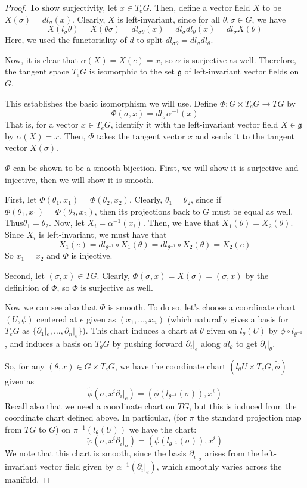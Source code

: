 \documentclass[fontsize=11pt]{scrartcl} %
\numberwithin{equation}{section} %
\numberwithin{figure}{section} %
\numberwithin{table}{section} %
\begin{document}
\begin{proof}
To show surjectivity, let $x\in T_eG$. Then, define a vector field $X$ to be $X(\sigma) = dl_{\sigma}(x)$.
Clearly, $X$ is left-invariant, since for all $\theta,\sigma \in G$, we have
\[
X(l_{\sigma}\theta) = X(\theta\sigma) = dl_{\sigma\theta}(x) = dl_{\sigma}dl_{\theta}(x) = dl_{\sigma}X(\theta)
\]
Here, we used the functoriality of $d$ to split $dl_{\sigma\theta} = dl_{\sigma}dl_{\theta}$.

Now, it is clear that $\alpha(X) = X(e) = x$, so $\alpha$ is surjective as well.
Therefore, the tangent space $T_eG$ is isomorphic to the set $\mathfrak{g}$ of left-invariant
vector fields on $G$. 

This establishes the basic isomorphism we will use. Define $\Phi:G\times T_eG\to TG$
by 
\[
\Phi(\sigma,x) = dl_{\sigma}\alpha^{-1}(x)
\] 
That is, for a vector $x\in T_eG$, identify
it with the left-invariant vector field $X\in\mathfrak{g}$ by $\alpha(X) = x$. Then,
$\Phi$ takes the tangent vector $x$ and sends it to the tangent vector $X(\sigma)$.

$\Phi$ can be shown to be a smooth bijection. First, we will show it is surjective and
injective, then we will show it is smooth.

First, let $\Phi(\theta_1,x_1) = \Phi(\theta_2,x_2)$. Clearly, $\theta_1 = \theta_2$, since
if $\Phi(\theta_1,x_1) = \Phi(\theta_2,x_2)$, then its projections back to $G$ must
be equal as well. Thus$\theta_1 =\theta_2$.
Now, let $X_i = \alpha^{-1}(x_i)$. Then, we have that $X_1(\theta)=X_2(\theta)$.
Since $X_i$ is left-invariant, we must have that
\[
X_1(e) = dl_{\theta^{-1}}\circ X_1(\theta) = dl_{\theta^{-1}}\circ X_2(\theta) = X_2(e)
\]
So $x_1 = x_2$ and $\Phi$ is injective.

Second, let $(\sigma,x)\in TG$. Clearly, $\Phi(\sigma,x) = X(\sigma) = (\sigma,x)$ by
the definition of $\Phi$, so $\Phi$ is surjective as well.

Now we can see also that $\Phi$ is smooth. To do so, let's choose a coordinate chart $(U,\phi)$
centered at $e$ given as $(x_1,\ldots,x_n)$ (which naturally gives a basis for $T_eG$
as $\{\partial_1|_e,\ldots,\partial_n|_e\}$).
This chart induces a chart at $\theta$ given on $l_{\theta}(U)$ by $\phi\circ l_{\theta^{-1}}$,
and induces a basis on $T_{\theta}G$ by pushing forward $\partial_i|_e$ along $dl_{\theta}$
to get $\partial_i|_{\theta}$.

So, for any $(\theta, x)\in G\times T_eG$, we have the coordinate chart $(l_{\theta}U\times T_eG,\tilde{\phi})$
given as
\[
\widetilde{\phi}(\sigma,x^i\partial_i|_e) = (\phi(l_{\theta^{-1}}(\sigma)), x^i)
\]
Recall also that we need a coordinate chart on $TG$, but this is induced from the
coordinate chart defined above. In particular, (for $\pi$ the standard projection map
from $TG$ to $G$) on $\pi^{-1}(l_{\theta}(U))$ we have the
chart:
\[
\widetilde{\varphi}(\sigma,x^i\partial_i|_{\sigma}) = (\phi(l_{\theta^{-1}}(\sigma)),x^i)
\]
We note that this chart is smooth, since the basis $\partial_i|_{\sigma}$ arises from
the left-invariant vector field given by $\alpha^{-1}(\partial_i|_e)$, which smoothly varies
across the manifold.


\end{proof}
\end{document}
